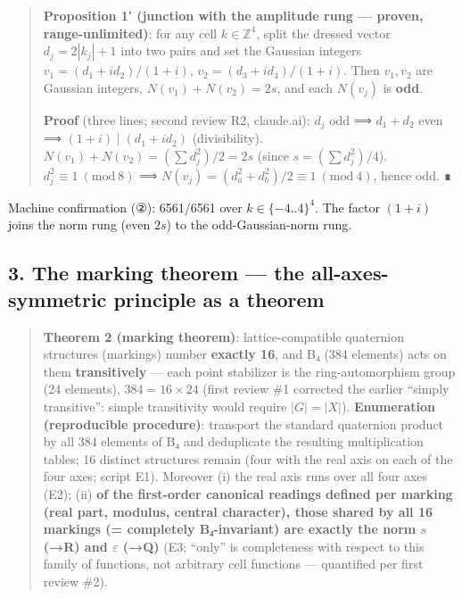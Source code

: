 \documentclass[
]{article}
\begin{document}
\begin{quote}
\textbf{Proposition 1′ (junction with the amplitude rung --- proven,
range-unlimited)}: for any cell \(k\in\mathbb{Z}^4\), split the dressed
vector \(d_j=2|k_j|+1\) into two pairs and set the Gaussian integers
\(v_1=(d_1+id_2)/(1+i)\), \(v_2=(d_3+id_4)/(1+i)\). Then \(v_1,v_2\) are
Gaussian integers, \(N(v_1)+N(v_2)=2s\), and each \(N(v_j)\) is
\textbf{odd}.

\textbf{Proof} (three lines; second review R2, claude.ai): \(d_j\) odd ⟹
\(d_1+d_2\) even ⟹ \((1+i)\mid(d_1+id_2)\) (divisibility).
\(N(v_1)+N(v_2)=(\sum d_j^2)/2=2s\) (since \(s=(\sum d_j^2)/4\)).
\(d_j^2\equiv1\ (\mathrm{mod}\ 8)\) ⟹
\(N(v_j)=(d_a^2+d_b^2)/2\equiv1\ (\mathrm{mod}\ 4)\), hence odd. ∎
\end{quote}

Machine confirmation (②): 6561/6561 over \(k\in\{-4..4\}^4\). The factor
\((1+i)\) joins the norm rung (even \(2s\)) to the odd-Gaussian-norm
rung.

\subsection{3. The marking theorem --- the all-axes-symmetric principle
as a
theorem}\label{the-marking-theorem-the-all-axes-symmetric-principle-as-a-theorem}

\begin{quote}
\textbf{Theorem 2 (marking theorem)}: lattice-compatible quaternion
structures (markings) number \textbf{exactly 16}, and B₄ (384 elements)
acts on them \textbf{transitively} --- each point stabilizer is the
ring-automorphism group (24 elements), \(384=16\times24\) (first review
\#1 corrected the earlier ``simply transitive'': simple transitivity
would require \(|G|=|X|\)). \textbf{Enumeration (reproducible
procedure)}: transport the standard quaternion product by all 384
elements of B₄ and deduplicate the resulting multiplication tables; 16
distinct structures remain (four with the real axis on each of the four
axes; script E1). Moreover (i) the real axis runs over all four axes
(E2); (ii) \textbf{of the first-order canonical readings defined per
marking (real part, modulus, central character), those shared by all 16
markings (= completely B₄-invariant) are exactly the norm \(s\) (→R) and
\(\varepsilon\) (→Q)} (E3; ``only'' is completeness with respect to this
family of functions, not arbitrary cell functions --- quantified per
first review \#2).
\end{quote}
\end{document}
